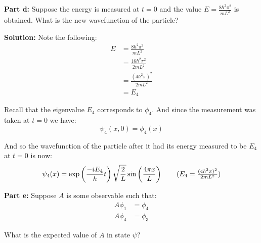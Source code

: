 \documentclass{article}
\begin{document}
\noindent\textbf{Part d:} Suppose the energy is measured at $t=0$ and the value $E=\frac{8\hbar^2\pi^2}{mL^2}$ is obtained. What is the new wavefunction of the particle?
\bigskip

\noindent\textbf{Solution:} Note the following:
\begin{align*}
    E&=\frac{8\hbar^2\pi^2}{mL^2}\\
    &=\frac{16\hbar^2\pi^2}{2mL^2}\\
    &=\frac{(4\hbar^2\pi)^2}{2mL^2}\\
    &=E_4\tag{def. of $E_4$}
\end{align*}

Recall that the eigenvalue $E_4$ corresponds to $\phi_4$. And since the measurement was taken at $t=0$ we have:
$$\psi_4(x,0)=\phi_4(x)$$

And so the wavefunction of the particle after it had its energy measured to be $E_4$ at $t=0$ is now:
\begin{align*}
    \psi_4(x)=\exp\left(\frac{-iE_4}{\hbar}t\right)\sqrt{\frac{2}{L}}\sin\left(\frac{4\pi x}{L}\right)\tag{$E_4=\frac{(4\hbar^2\pi)^2}{2mL^2}$}
\end{align*}
\bigskip

\noindent\textbf{Part e:} Suppose $A$ is some observable such that:
\begin{align*}
    A\phi_1&=\phi_4\\
    A\phi_4&=\phi_3
\end{align*}

What is the expected value of $A$ in state $\psi$?
\bigskip
\end{document}
